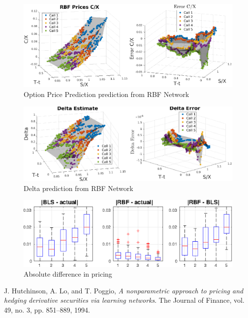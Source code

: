 \documentclass[11pt, fleqn]{article}
\begin{document}
\begin{figure}[!h]
\begin{center}
	\includegraphics[scale=.6] {q1_rbf_price.eps}
	\caption{Option Price Prediction prediction from RBF Network}
	\label{fig:q1-rbf-price}
\end{center}
\end{figure}

\begin{figure}[!h]
\begin{center}
	\includegraphics[scale=.6] {q1_rbf_delta.eps}
	\caption{Delta prediction from RBF Network}
	\label{fig:q1-rbf-delta}
\end{center}
\end{figure}

\begin{figure}[!h]
\begin{center}
	\includegraphics[scale=.65] {q1_bls_vs_rbf.eps}
	\caption{Absolute difference in pricing}
	\label{fig:q1-bls-vs-rbf}
\end{center}
\end{figure}

\begin{thebibliography}{9}
J. Hutchinson, A. Lo, and T. Poggio,
\textit{A nonparametric  approach  to  pricing  and  hedging  derivative
securities via learning networks}. 
The Journal of Finance, vol. 49, no. 3, pp. 851–889, 1994.

\end{thebibliography}
\end{document}
